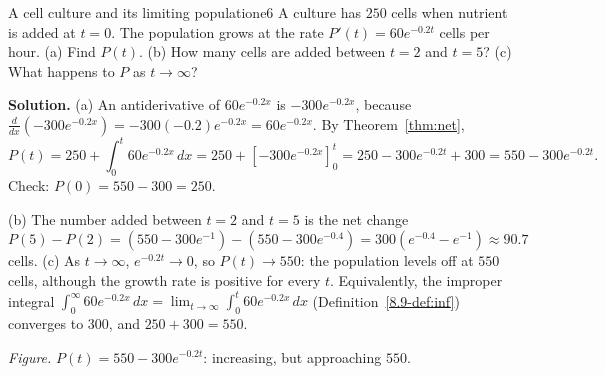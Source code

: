 \documentclass[11pt]{article}
\begin{document}
\begin{exmp}{A cell culture and its limiting population}{e6}
A culture has $250$ cells when nutrient is added at $t=0$. The population grows at the rate $P'(t)=60e^{-0.2t}$ cells per hour. (a) Find $P(t)$. (b) How many cells are added between $t=2$ and $t=5$? (c) What happens to $P$ as $t\to\infty$?

\textbf{Solution.} (a) An antiderivative of $60e^{-0.2x}$ is $-300e^{-0.2x}$, because $\frac{d}{dx}\left(-300e^{-0.2x}\right)=-300(-0.2)e^{-0.2x}=60e^{-0.2x}$. By Theorem~\ref{thm:net},
\[
P(t)=250+\int_0^t60e^{-0.2x}\,dx=250+\left[-300e^{-0.2x}\right]_0^t=250-300e^{-0.2t}+300=550-300e^{-0.2t}.
\]
Check: $P(0)=550-300=250$. \checkmark

(b) The number added between $t=2$ and $t=5$ is the net change $P(5)-P(2)=\left(550-300e^{-1}\right)-\left(550-300e^{-0.4}\right)=300\left(e^{-0.4}-e^{-1}\right)\approx90.7$ cells.
(c) As $t\to\infty$, $e^{-0.2t}\to0$, so $P(t)\to550$: the population levels off at $550$ cells, although the growth rate is positive for every $t$. Equivalently, the improper integral $\int_0^\infty60e^{-0.2x}\,dx=\lim_{t\to\infty}\int_0^t60e^{-0.2x}\,dx$ (Definition~\ref{8.9-def:inf}) converges to $300$, and $250+300=550$.

\begin{center}
\par\small\emph{Figure.} $P(t)=550-300e^{-0.2t}$: increasing, but approaching $550$.
\end{center}
\end{exmp}
\end{document}
